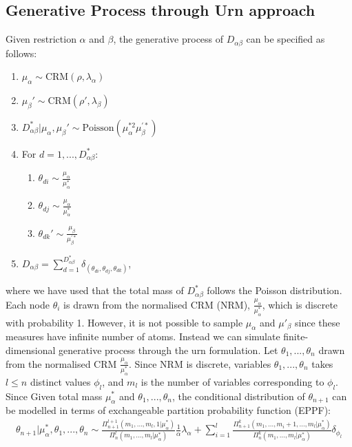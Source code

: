 \documentclass{article}
\begin{document}
\subsection{Generative Process through Urn approach}
Given restriction $\alpha$ and $\beta$, the generative process of $D_{\alpha\beta}$ can be specified as follows:
\begin{enumerate}
\item $\mu_\alpha \sim \text{CRM}(\rho, \lambda_\alpha)$
\item $\mu_\beta' \sim \text{CRM}(\rho', \lambda_\beta)$
\item $D_{\alpha\beta}^* | \mu_\alpha, \mu_\beta' \sim \text{Poisson}(\mu_\alpha^{*2}\mu_\beta^{'*})$
\item For $d=1,...,D_{\alpha\beta}^*$:
\begin{enumerate}
\item $\theta_{di} \sim \frac{\mu_\alpha}{\mu_\alpha^*}$
\item $\theta_{dj} \sim \frac{\mu_\alpha}{\mu_\alpha^*}$
\item $\theta_{dk}' \sim \frac{\mu_\beta}{\mu_\beta^{'*}}$
\end{enumerate}
\item $D_{\alpha\beta} = \sum_{d=1}^{D_{\alpha\beta}^*} \delta_{(\theta_{di}, \theta_{dj}, \theta_{dk})}$,
\end{enumerate}
where we have used that the total mass of $D_{\alpha\beta}^*$ follows the Poisson distribution. Each node $\theta_i$ is drawn from the normalised CRM (NRM), $\frac{\mu_\alpha}{\mu_\alpha^*}$, which is discrete with probability 1. However, it is not possible to sample $\mu_\alpha$ and $\mu'_\beta$ since these measures have infinite number of atoms. Instead we can simulate finite-dimensional generative process through the urn formulation. Let $\theta_1, ..., \theta_n$ drawn from the normalised CRM $\frac{\mu_\alpha}{\mu_\alpha^*}$. Since NRM is discrete, variables $\theta_1, ..., \theta_n$ takes $l \leq n$ distinct values $\phi_l$, and $m_l$ is the number of variables corresponding to $\phi_l$.
Since  Given total mass $\mu_\alpha^*$ and $\theta_1, ..., \theta_n$, the conditional distribution of $\theta_{n+1}$ can be modelled in terms of exchangeable partition probability function (EPPF):
\begin{align}
\label{eqn:eppf}
\theta_{n+1} | \mu_\alpha^*, \theta_1,...,\theta_n \sim \frac{\Pi_{n+1}^{l+1}(m_1, ..., m_l, 1 | \mu_\alpha^*)}{\Pi_{n}^{l}(m_1, ..., m_l | \mu_\alpha^*)} \frac{1}{\alpha} \lambda_\alpha
+ \sum_{i=1}^{l}\frac{\Pi_{n+1}^{k}(m_1, ..., m_{i}+1, ..., m_l | \mu_\alpha^*)}{\Pi_{n}^{k}(m_1, ..., m_l| \mu_\alpha^*)} \delta_{\phi_l}
\end{align}
\end{document}
